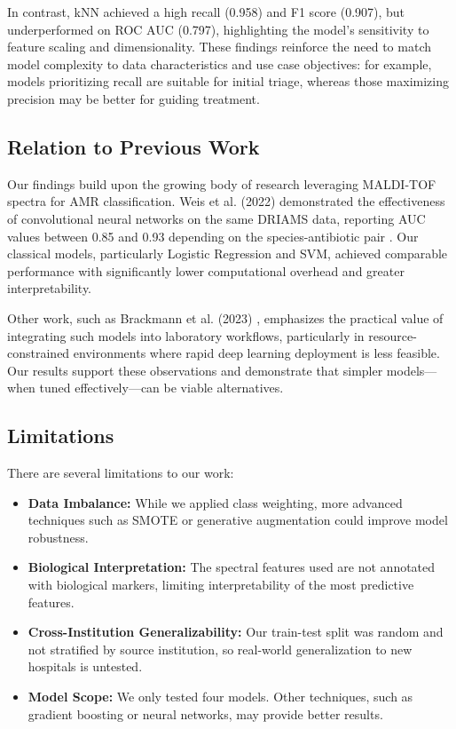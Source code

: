 \documentclass{article}
\begin{document}
In contrast, kNN achieved a high recall (0.958) and F1 score (0.907), but underperformed on ROC AUC (0.797), highlighting the model’s sensitivity to feature scaling and dimensionality. These findings reinforce the need to match model complexity to data characteristics and use case objectives: for example, models prioritizing recall are suitable for initial triage, whereas those maximizing precision may be better for guiding treatment.

\subsection*{Relation to Previous Work}
Our findings build upon the growing body of research leveraging MALDI-TOF spectra for AMR classification. Weis et al. (2022) demonstrated the effectiveness of convolutional neural networks on the same DRIAMS data, reporting AUC values between 0.85 and 0.93 depending on the species-antibiotic pair \citep{doi:10.1038/s41591-021-01619-9}. Our classical models, particularly Logistic Regression and SVM, achieved comparable performance with significantly lower computational overhead and greater interpretability.

Other work, such as Brackmann et al. (2023) \citep{doi:10.1093/cid/ciad080}, emphasizes the practical value of integrating such models into laboratory workflows, particularly in resource-constrained environments where rapid deep learning deployment is less feasible. Our results support these observations and demonstrate that simpler models—when tuned effectively—can be viable alternatives.

\subsection*{Limitations}
There are several limitations to our work:
\begin{itemize}
    \item \textbf{Data Imbalance:} While we applied class weighting, more advanced techniques such as SMOTE or generative augmentation could improve model robustness.
    \item \textbf{Biological Interpretation:} The spectral features used are not annotated with biological markers, limiting interpretability of the most predictive features.
    \item \textbf{Cross-Institution Generalizability:} Our train-test split was random and not stratified by source institution, so real-world generalization to new hospitals is untested.
    \item \textbf{Model Scope:} We only tested four models. Other techniques, such as gradient boosting or neural networks, may provide better results.
\end{itemize}
\end{document}
